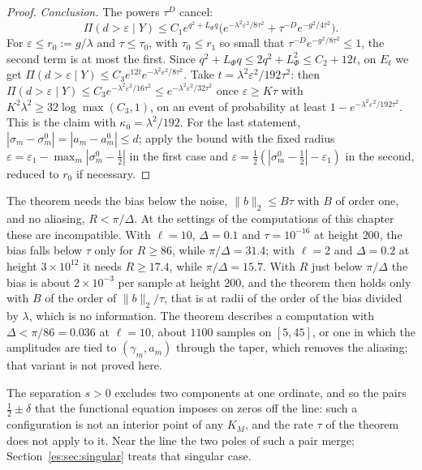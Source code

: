 \begin{proof}
\emph{Conclusion.} The powers $\tau^D$ cancel:
\[
\Pi(d>\varepsilon\mid Y)\le C_1e^{q^2+L_\Phi q}\bigl(e^{-\lambda^2\varepsilon^2/8\tau^2}+\tau^{-D}e^{-g^2/4\tau^2}\bigr).
\]
For $\varepsilon\le r_0:=g/\lambda$ and $\tau\le\tau_0$, with $\tau_0\le r_1$ so small that $\tau^{-D}e^{-g^2/8\tau^2}\le1$, the second term is at most the first. Since $q^2+L_\Phi q\le2q^2+L_\Phi^2\le C_2+12t$, on $E_t$ we get $\Pi(d>\varepsilon\mid Y)\le C_3e^{12t}e^{-\lambda^2\varepsilon^2/8\tau^2}$. Take $t=\lambda^2\varepsilon^2/192\tau^2$: then $\Pi(d>\varepsilon\mid Y)\le C_3e^{-\lambda^2\varepsilon^2/16\tau^2}\le e^{-\lambda^2\varepsilon^2/32\tau^2}$ once $\varepsilon\ge K\tau$ with $K^2\lambda^2\ge32\log\max(C_3,1)$, on an event of probability at least $1-e^{-\lambda^2\varepsilon^2/192\tau^2}$. This is the claim with $\kappa_0=\lambda^2/192$. For the last statement, $|\sigma_m-\sigma^0_m|=|a_m-a^0_m|\le d$; apply the bound with the fixed radius $\varepsilon=\varepsilon_1-\max_m|\sigma^0_m-\tfrac12|$ in the first case and $\varepsilon=\tfrac12(|\sigma^0_m-\tfrac12|-\varepsilon_1)$ in the second, reduced to $r_0$ if necessary.
\end{proof}

\begin{remark}\label{es:rem:settings}
The theorem needs the bias below the noise, $\|b\|_2\le B\tau$ with $B$ of order one, and no aliasing, $R<\pi/\Delta$. At the settings of the computations of this chapter these are incompatible. With $\ell=10$, $\Delta=0.1$ and $\tau=10^{-16}$ at height $200$, the bias falls below $\tau$ only for $R\ge86$, while $\pi/\Delta=31.4$; with $\ell=2$ and $\Delta=0.2$ at height $3\times10^{12}$ it needs $R\ge17.4$, while $\pi/\Delta=15.7$. With $R$ just below $\pi/\Delta$ the bias is about $2\times10^{-3}$ per sample at height $200$, and the theorem then holds only with $B$ of the order of $\|b\|_2/\tau$, that is at radii of the order of the bias divided by $\lambda$, which is no information. The theorem describes a computation with $\Delta<\pi/86=0.036$ at $\ell=10$, about $1100$ samples on $[5,45]$, or one in which the amplitudes are tied to $(\gamma_m,a_m)$ through the taper, which removes the aliasing; that variant is not proved here.

The separation $s>0$ excludes two components at one ordinate, and so the pairs $\tfrac12\pm\delta$ that the functional equation imposes on zeros off the line: such a configuration is not an interior point of any $K_M$, and the rate $\tau$ of the theorem does not apply to it. Near the line the two poles of such a pair merge; Section~\ref{es:sec:singular} treats that singular case.
\end{remark}


